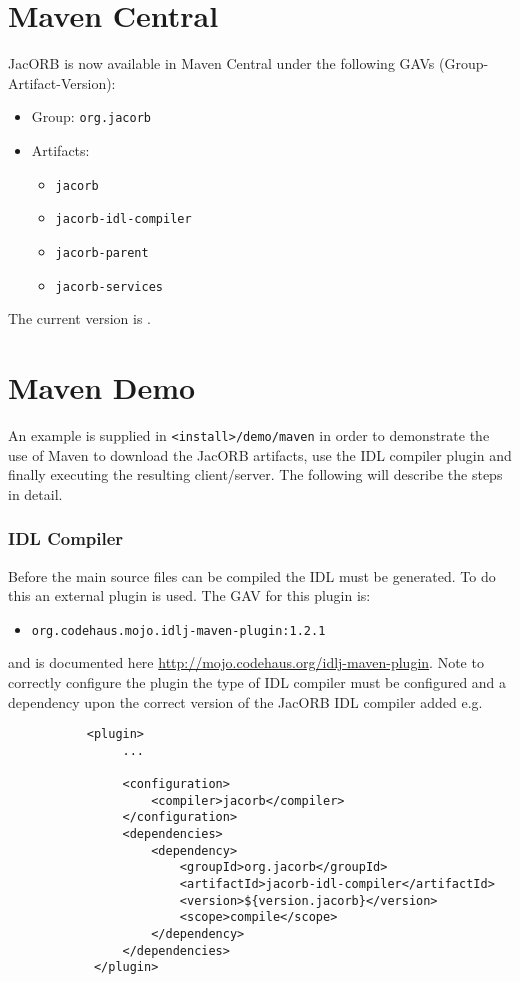 
\section{Maven Central}

JacORB is now available in Maven Central under the following GAVs (Group-Artifact-Version):

\begin{itemize}
\item Group: \texttt{org.jacorb}
\item Artifacts:
  \begin{itemize}
    \item \texttt{jacorb}
    \item \texttt{jacorb-idl-compiler}
    \item \texttt{jacorb-parent}
    \item \texttt{jacorb-services}
  \end{itemize}
\end{itemize}

The current version is \JacORBVersion.


\section{Maven Demo}

An example is supplied in \texttt{<install>/demo/maven} in order to demonstrate the use of Maven to download the JacORB artifacts, use the IDL compiler plugin and finally executing the resulting client/server. The following will describe the steps in detail.

\subsubsection{IDL Compiler}
Before the main source files can be compiled the IDL must be generated. To do this an external plugin is used. The GAV for this plugin is:
\begin{itemize}
\item \texttt{org.codehaus.mojo.idlj-maven-plugin:1.2.1}
\end{itemize}

and is documented here \href{http://mojo.codehaus.org/idlj-maven-plugin}{http://mojo.codehaus.org/idlj-maven-plugin}. Note to correctly configure the plugin the type of IDL compiler must be configured and a dependency upon the correct version of the JacORB IDL compiler added e.g.
\begin{verbatim}
           <plugin>
                ...

                <configuration>
                    <compiler>jacorb</compiler>
                </configuration>
                <dependencies>
                    <dependency>
                        <groupId>org.jacorb</groupId>
                        <artifactId>jacorb-idl-compiler</artifactId>
                        <version>${version.jacorb}</version>
                        <scope>compile</scope>
                    </dependency>
                </dependencies>
            </plugin>
\end{verbatim}

